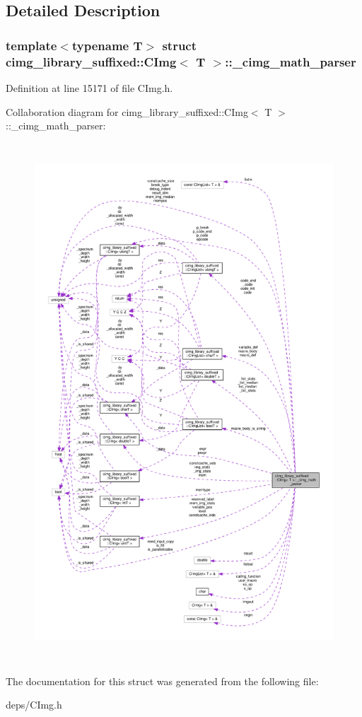 \subsection{Detailed Description}
\subsubsection*{template$<$typename T$>$\newline
struct cimg\+\_\+library\+\_\+suffixed\+::\+C\+Img$<$ T $>$\+::\+\_\+cimg\+\_\+math\+\_\+parser}



Definition at line 15171 of file C\+Img.\+h.



Collaboration diagram for cimg\+\_\+library\+\_\+suffixed\+:\+:C\+Img$<$ T $>$\+:\+:\+\_\+cimg\+\_\+math\+\_\+parser\+:
\nopagebreak
\begin{figure}[H]
\begin{center}
\leavevmode
\includegraphics[height=550pt]{d6/d7c/structcimg__library__suffixed_1_1CImg_1_1__cimg__math__parser__coll__graph}
\end{center}
\end{figure}


The documentation for this struct was generated from the following file\+:\begin{DoxyCompactItemize}
\item 
deps/C\+Img.\+h\end{DoxyCompactItemize}
